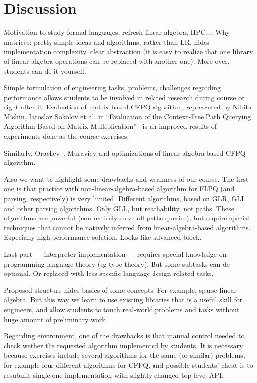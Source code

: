 \documentclass[sigconf]{acmart}
\begin{document}
\section{Discussion}

Motivation to study formal languages, refresh linear algebra, HPC....
Why matrices: pretty simple ideas and algorithms, rather than LR, hides implementation complexity, clear abstraction (it is easy to realize that one library of linear algebra operations can be replaced with another one). More over, students can do it yourself.

Simple formulation of engineering tasks, problems, challenges regarding performance allows students to be involved in related research during course or right after it. 
Evaluation of matrix-based CFPQ algorithm, represented by Nikita Mishin, Iaroslav Sokolov et al. in ``Evaluation of the Context-Free Path Querying Algorithm Based on Matrix Multiplication''~\cite{10.1145/3327964.3328503} is an improved results of experiments done as the course exercises. 

Similarly, Orachev~\cite{!!!}. Muraviev and optimizations of linear algebra based CFPQ algorithm.

Also we want to highlight some drawbacks and weakness of our course.
The first one is that practice with non-linear-algebra-based algorithm for FLPQ (and parsing, respectively) is very limited. 
Different algorithms, based on GLR, GLL and other parsing algorithms. 
Only GLL, but reachability, not paths.
These algorithms are powerful (can natively solve all-paths queries), but require special techniques that cannot be natively inferred from linear-algebra-based algorithms.
Especially high-performance solution.
Looks like advanced block. 

Last part --- interpreter implementation --- requires special knowledge on programming language theory (eg type theory).
But some subtasks can de optional. 
Or replaced with less specific language design related tasks.

Proposed structure hides basics of some concepts. 
For example, sparse linear algebra.
But this way we learn to use existing libraries that is a useful skill for engineers, and allow students to touch real-world problems and tasks without huge amount of preliminary work.

Regarding environment, one of the drawbacks is that manual control needed to check wether the requested algorithm implemented by students.
It is necessary because exercises include several algorithms for the same (or similar) problems, for example four different algorithms for CFPQ, and possible students' cheat is to resubmit single one implementation with slightly changed top level API.
\end{document}

